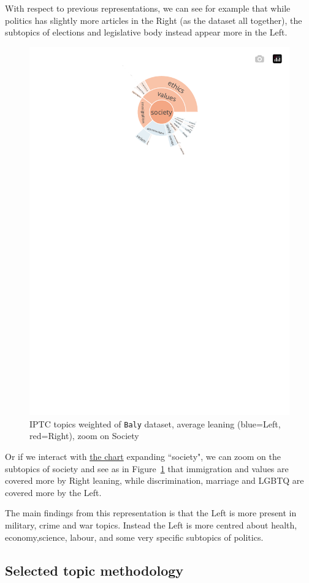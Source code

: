 With respect to previous representations, we can see for example that while politics has slightly more articles in the Right (as the dataset all together), the subtopics of elections and legislative body instead appear more in the Left.

\begin{figure}[!htbp]
    \centering
    \includegraphics[trim={0 0 0 0},clip,width=0.5\linewidth]{figures/baly_iptc_weighted_by_leaning_zoom_society.pdf}
    \caption{IPTC topics weighted of \texttt{Baly} dataset, average leaning (blue=Left, red=Right), zoom on Society}
    \label{fig:baly_iptc_weighted_by_leaning_zoom_society}
\end{figure}

Or if we interact with \href{https://martinomensio.github.io/phd-project/figures/baly_iptc_weighted_by_leaning.html}{the chart} expanding ``society", we can zoom on the subtopics of society and see as in Figure~\ref{fig:baly_iptc_weighted_by_leaning_zoom_society} that immigration and values are covered more by Right leaning, while discrimination, marriage  and LGBTQ are covered more by the Left. 

The main findings from this representation is that the Left is more present in military, crime and war topics. Instead the Left is more centred about health, economy,science, labour, and some very specific subtopics of politics.


\subsection{\statusgreen Selected topic methodology}
\label{ssec:topic_topic_choice}

